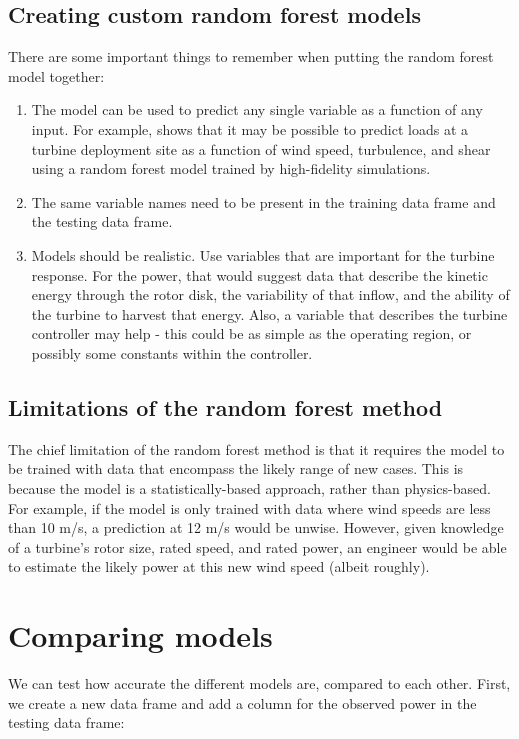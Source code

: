 \documentclass[nojss]{jss}\usepackage[]{graphicx}\usepackage[]{color}
\begin{document}
\subsection{Creating custom random forest models}
There are some important things to remember when putting the random forest model together:
\begin{enumerate}
\item The model can be used to predict any single variable as a function of any input. For example, \cite{Clifton_2013_d} shows that it may be possible to predict loads at a turbine deployment site as a function of wind speed, turbulence, and shear using a random forest model trained by high-fidelity simulations.
\item The same variable names need to be present in the training data frame and the testing data frame.
\item Models should be realistic. Use variables that are important for the turbine response. For the power, that would suggest data that describe the kinetic energy through the rotor disk, the variability of that inflow, and the ability of the turbine to harvest that energy. Also, a variable that describes the turbine controller may help - this could be as simple as the operating region, or possibly some constants within the controller. 
\end{enumerate}

\subsection{Limitations of the random forest method}
The chief limitation of the random forest method is that it requires the model to be trained with data that encompass the likely range of new cases. This is because the model is a statistically-based approach, rather than physics-based. For example, if the model is only trained with data where wind speeds are less than 10 m/s, a prediction at 12 m/s would be unwise. However, given knowledge of a turbine's rotor size, rated speed, and rated power, an engineer would be able to estimate the likely power at this new wind speed (albeit roughly).

\section{Comparing models}
We can test how accurate the different models are, compared to each other. First, we create a new data frame and add a column for the observed power in the testing data frame:
\end{document}
